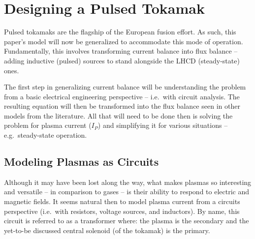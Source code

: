 %
%
%
%
%
%
%
%

\chapter{Designing a Pulsed Tokamak}

\label{chapter:pulsed}

Pulsed tokamaks are the flagship of the European fusion  effort. As such, this paper's model will now be generalized to accommodate this mode of operation. Fundamentally, this involves transforming current balance into flux balance -- adding inductive (pulsed) sources to stand alongside the LHCD (steady-state) ones.

The first step in generalizing current balance will be understanding the problem from a basic electrical engineering perspective -- i.e.\ with circuit analysis.\cite{circuit} The resulting equation will then be transformed into the flux balance seen in other models from the literature. All that will need to be done then is solving the problem for plasma current ($I_P$) and simplifying it for various situations -- e.g.\ steady-state operation.


\section{Modeling Plasmas as Circuits}

Although it may have been lost along the way, what makes plasmas so interesting and versatile -- in comparison to gases -- is their ability to respond to electric and magnetic fields. It seems natural then to model plasma current from a circuits perspective (i.e.\ with resistors, voltage sources, and inductors). By name, this circuit is referred to as a transformer where: the plasma is the secondary and the yet-to-be discussed central solenoid (of the tokamak) is the primary.

